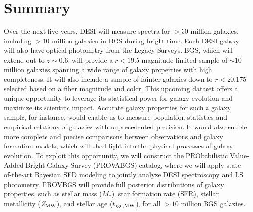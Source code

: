 \section{Summary}
Over the next five years, DESI will measure spectra for ${>}30$ million
galaxies, including ${>}10$ million galaxies in BGS during bright time.
Each DESI galaxy will also have optical photometry from the Legacy Surveys. 
BGS, which will extend out to $z\sim0.6$, will provide a $r < 19.5$
magnitude-limited sample of ${\sim}10$ million galaxies spanning a wide range
of galaxy properties with high completeness.
It will also include a sample of fainter galaxies down to $r < 20.175$ selected
based on a fiber magnitude and color. 
This upcoming dataset offers a unique opportunity to leverage its statistical
power for galaxy evolution and maximize its scientific impact. 
Accurate galaxy properties for such a galaxy sample, for instance,  would
enable us to measure population statistics and empirical relations of galaxies
with unprecedented precision. 
It would also enable more complete and precise comparisons between observations
and galaxy formation models, which will shed light into the physical processes
of galaxy evolution.
To exploit this opportunity, we will construct the PRObabilistic Value-Added
Bright Galaxy Survey (PROVABGS) catalog, where we will apply state-of-the-art
Bayesian SED modeling to jointly analyze DESI spectroscopy and LS photometry. 
PROVBGS will provide full posterior distributions of galaxy properties, such as
stellar mass ($M_*$), star formation rate (SFR), stellar metallicity 
($Z_{\rm MW}$), and stellar age ($t_{\rm age, MW}$), for all ${>}10$ million BGS galaxies.

